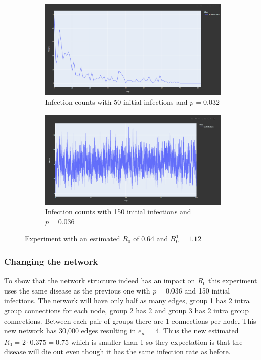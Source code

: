 \begin{figure}
    \centering
    \begin{subfigure}[b]{0.475\textwidth}
        \centering
        \includegraphics[width=\textwidth]{images/exp_big_r0_fail.png}
        \caption[Network2]%
        {{\small Infection counts with 50 initial infections and $p = 0.032$}}   
    \end{subfigure}
    \hfill
    \begin{subfigure}[b]{0.475\textwidth}  
        \centering 
        \includegraphics[width=\textwidth]{images/exp_big_r0_success.png}
        \caption[]%
        {{\small Infection counts with 150 initial infections and $p = 0.036$}}    
    \end{subfigure}
    \caption[Experiment with an estimated $R_0$ of 0.64 and $R_0^1 = 1.12$]
    {\small Experiment with an estimated $R_0$ of 0.64 and $R_0^1 = 1.12$} 
    \label{fig:exp_r0_big}
\end{figure}

\subsubsection{Changing the network}
To show that the network structure indeed has an impact on $R_0$ this experiment uses the same disease as the previous one with $p=0.036$ and 150 initial infections. The network will have only half as many edges, group 1 has 2 intra group connections for each node, group 2 has 2 and group 3 has 2 intra group connections. Between each pair of groups there are 1 connections per node. This new network has 30,000 edges resulting in $e_\mu$ = 4. Thus the new estimated $R_0=2\cdot0.375=0.75$ which is smaller than 1 so they expectation is that the disease will die out even though it has the same infection  rate as before.

